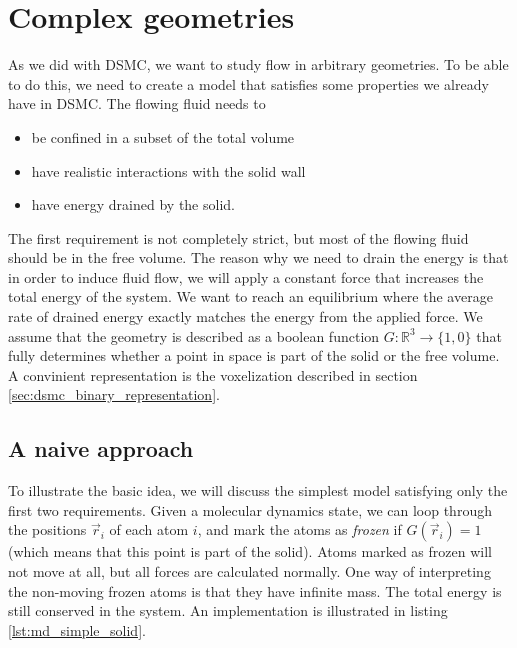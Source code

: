 \section{Complex geometries}
As we did with DSMC, we want to study flow in arbitrary geometries.  To be able to do this, we need to create a model that satisfies some properties we already have in DSMC. The flowing fluid needs to
\begin{itemize}
	\item be confined in a subset of the total volume
	\item have realistic interactions with the solid wall
	\item have energy drained by the solid.
\end{itemize}
The first requirement is not completely strict, but most of the flowing fluid should be in the free volume. The reason why we need to drain the energy is that in order to induce fluid flow, we will apply a constant force that increases the total energy of the system. We want to reach an equilibrium where the average rate of drained energy exactly matches the energy from the applied force. We assume that the geometry is described as a boolean function $G : \mathbb{R}^3\rightarrow \{1,0\}$ that fully determines whether a point in space is part of the solid or the free volume. A convinient representation is the voxelization described in section \ref{sec:dsmc_binary_representation}. 
\subsection{A naive approach}
To illustrate the basic idea, we will discuss the simplest model satisfying only the first two requirements. Given a molecular dynamics state, we can loop through the positions $\vec r_i$ of each atom $i$, and mark the atoms as \textit{frozen} if $G(\vec r_i) = 1$ (which means that this point is part of the solid). Atoms marked as frozen will not move at all, but all forces are calculated normally. One way of interpreting the non-moving frozen atoms is that they have infinite mass. The total energy is still conserved in the system. An implementation is illustrated in listing \ref{lst:md_simple_solid}.

